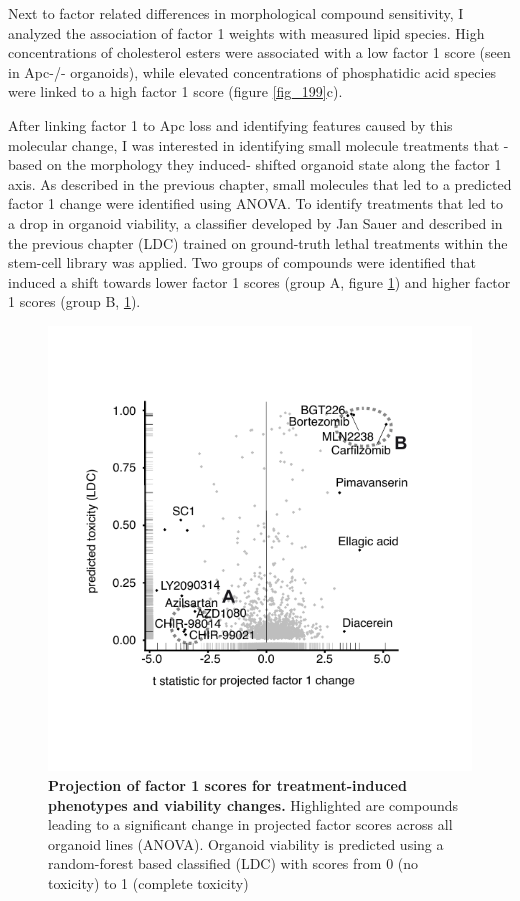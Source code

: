 \begin{flushleft}
Next to factor related differences in morphological compound sensitivity, I analyzed the association of factor 1 weights with measured lipid species. High concentrations of cholesterol esters were associated with a low factor 1 score (seen in Apc-/- organoids), while elevated concentrations of phosphatidic acid species were linked to a high factor 1 score (figure \ref{fig_199}c).

\smallbreak
After linking factor 1 to Apc loss and identifying features caused by this molecular change, I was interested in identifying small molecule treatments that -based on the morphology they induced- shifted organoid state along the factor 1 axis. As described in the previous chapter, small molecules that led to a predicted factor 1 change were identified using ANOVA. To identify treatments that led to a drop in organoid viability, a classifier developed by Jan Sauer and described in the previous chapter (LDC) trained on ground-truth lethal treatments within the stem-cell library was applied. Two groups of compounds were identified that induced a shift towards lower factor 1 scores (group A, figure \ref{fig_180}) and higher factor 1 scores (group B, \ref{fig_180}). 

\begin{figure}[h]
\centering
\includegraphics[scale=0.75,
                keepaspectratio]{figures/adenomaprofiling/pdf/fig_2_3.pdf}
\caption{\textbf{Projection of factor 1 scores for treatment-induced phenotypes and viability changes.} Highlighted are compounds leading to a significant change in projected factor scores across all organoid lines (ANOVA). Organoid viability is predicted using a random-forest based classified (LDC) with scores from 0 (no toxicity) to 1 (complete toxicity)}
\label{fig_180}
\end{figure}
\bigbreak


\end{flushleft}
